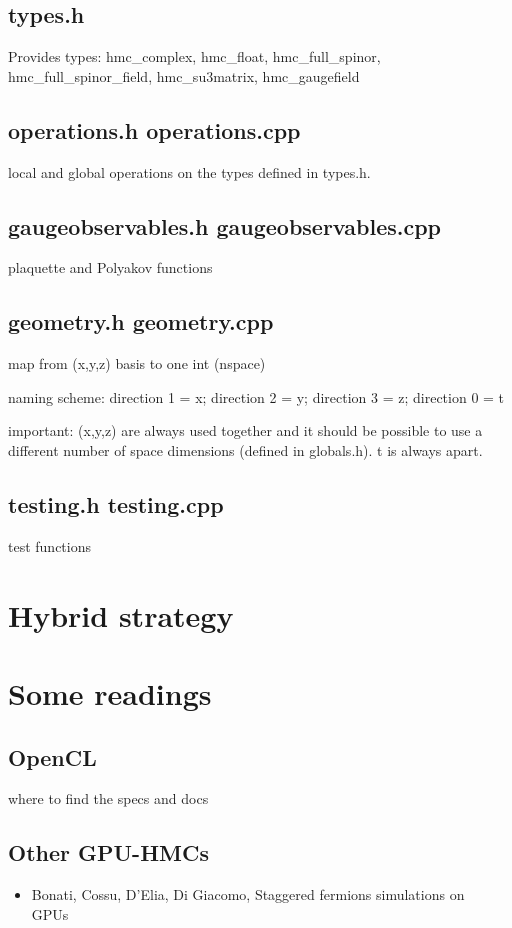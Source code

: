 \documentclass[a4paper,11pt]{article}
\begin{document}
\subsection{types.h}
Provides types: hmc\_complex, hmc\_float, hmc\_full\_spinor, hmc\_full\_spinor\_field, hmc\_su3matrix, hmc\_gaugefield
\subsection{operations.h operations.cpp}
local and global operations on the types defined in types.h. 
\subsection{gaugeobservables.h gaugeobservables.cpp}
plaquette and Polyakov functions
\subsection{geometry.h geometry.cpp}
map from (x,y,z) basis to one int (nspace)

naming scheme: direction 1 = x; direction 2 = y; direction 3 = z; direction 0 = t

important: (x,y,z) are always used together and it should be possible to use a different number of space dimensions (defined in globals.h). t is always apart.

\subsection{testing.h testing.cpp}
test functions


\section{Hybrid strategy}

\section{Some readings}
\subsection{OpenCL}
where to find the specs and docs
\subsection{Other GPU-HMCs}
\begin{itemize}
\item Bonati, Cossu, D'Elia, Di Giacomo, Staggered fermions simulations on GPUs~\cite{Bonati:2010qu}
\end{itemize}



\end{document}
